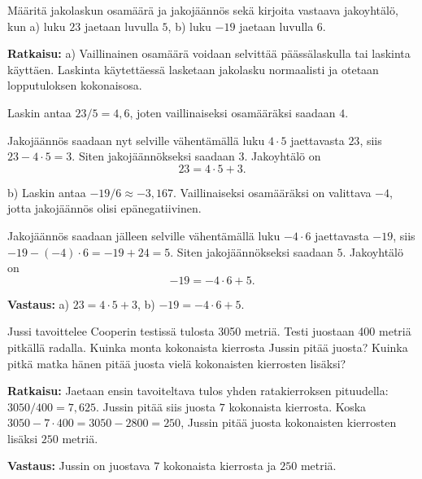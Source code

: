 \begin{esimerkki}
Määritä jakolaskun osamäärä ja jakojäännös sekä kirjoita vastaava jakoyhtälö, kun
a) luku $23$ jaetaan luvulla $5$,  b)  luku $-19$ jaetaan luvulla $6$.

{\bf Ratkaisu:}
a) Vaillinainen osamäärä voidaan selvittää päässälaskulla tai laskinta käyttäen. Laskinta käytettäessä lasketaan jakolasku normaalisti ja otetaan lopputuloksen kokonaisosa.

Laskin antaa $23/5 = 4,6$, joten vaillinaiseksi osamääräksi saadaan $4$.

Jakojäännös saadaan nyt selville vähentämällä luku $4\cdot 5$ jaettavasta $23$, siis $23-4\cdot 5=3$. Siten jakojäännökseksi saadaan $3$. 
Jakoyhtälö on
\[
23 = 4\cdot 5 + 3.
\]

b) Laskin antaa $-19/6 \approx -3,167$. Vaillinaiseksi osamääräksi on valittava $-4$, jotta jakojäännös olisi epänegatiivinen.

Jakojäännös saadaan jälleen selville vähentämällä luku $-4\cdot 6$ jaettavasta $-19$, siis $-19-(-4)\cdot 6=-19+24=5$. Siten jakojäännökseksi saadaan $5$. 
Jakoyhtälö on
\[
-19 = -4\cdot 6 +5.
\]

{\bf Vastaus:} a) $23 = 4\cdot 5 + 3$, b) $-19 = -4\cdot 6 +5$.
\end{esimerkki}

%


\begin{esimerkki}
Jussi tavoittelee Cooperin testissä tulosta 3050 metriä. Testi juostaan 400 metriä pitkällä
radalla. Kuinka monta kokonaista kierrosta Jussin pitää juosta? Kuinka pitkä matka
hänen pitää juosta vielä kokonaisten kierrosten lisäksi?

{\bf Ratkaisu:}
Jaetaan ensin tavoiteltava tulos yhden ratakierroksen pituudella:
$3050  / 400  = 7,625$. Jussin pitää siis juosta $7$ kokonaista kierrosta.
Koska $3050  - 7 \cdot 400 = 3050  - 2800  = 250$, Jussin pitää juosta kokonaisten kierrosten lisäksi $250$ metriä.

{\bf Vastaus:} Jussin on juostava $7$ kokonaista kierrosta ja $250$ metriä.
\end{esimerkki}

